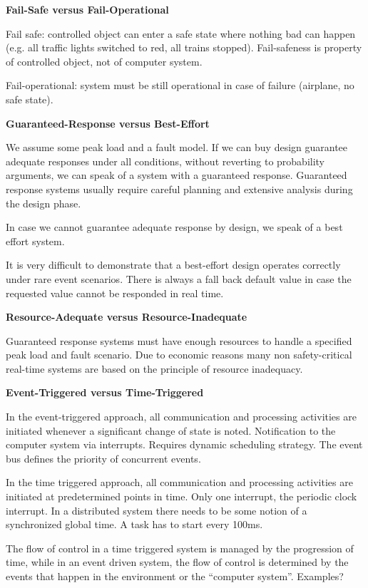 \textbf{Fail-Safe versus Fail-Operational}

Fail safe: controlled object can enter a safe state where nothing bad
can happen (e.g. all traffic lights switched to red, all trains
stopped). Fail-safeness is property of controlled object, not of
computer system.

Fail-operational: system must be still operational in case of failure
(airplane, no safe state).

\textbf{Guaranteed-Response versus Best-Effort}

We assume some peak load and a fault model. If we can buy design
guarantee adequate responses under all conditions, without reverting to
probability arguments, we can speak of a system with a guaranteed
response. Guaranteed response systems usually require careful planning
and extensive analysis during the design phase.

In case we cannot guarantee adequate response by design, we speak of a
best effort system.

It is very difficult to demonstrate that a best-effort design operates
correctly under rare event scenarios. There is always a fall back
default value in case the requested value cannot be responded in real
time.

\textbf{Resource-Adequate versus Resource-Inadequate}

Guaranteed response systems must have enough resources to handle a
specified peak load and fault scenario. Due to economic reasons many non
safety-critical real-time systems are based on the principle of resource
inadequacy.

\textbf{Event-Triggered versus Time-Triggered}

In the event-triggered approach, all communication and processing
activities are initiated whenever a significant change of state is
noted. Notification to the computer system via interrupts. Requires
dynamic scheduling strategy. The event bus defines the priority of
concurrent events.

In the time triggered approach, all communication and processing
activities are initiated at predetermined points in time. Only one
interrupt, the periodic clock interrupt. In a distributed system there
needs to be some notion of a synchronized global time. A task has to
start every 100ms.

The flow of control in a time triggered system is managed by the
progression of time, while in an event driven system, the flow of
control is determined by the events that happen in the environment or
the ``computer system''. Examples?

